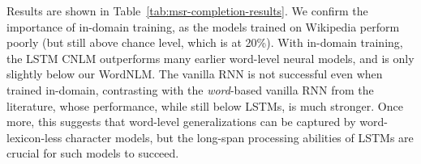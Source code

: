 Results are shown in Table~\ref{tab:msr-completion-results}.  We
confirm the importance of in-domain training, as the models
trained on Wikipedia perform poorly (but still above chance level,
which is at 20\%).  With in-domain training, the LSTM CNLM outperforms
many earlier word-level neural models, and is only slightly below our
WordNLM. %
The vanilla RNN is not successful even when trained in-domain,
contrasting with the \emph{word}-based vanilla RNN from the
literature, whose performance, while still below LSTMs, is much
stronger. Once more, this suggests that word-level generalizations can
be captured by word-lexicon-less character models, but the long-span
processing abilities of LSTMs are crucial for such models to succeed.




